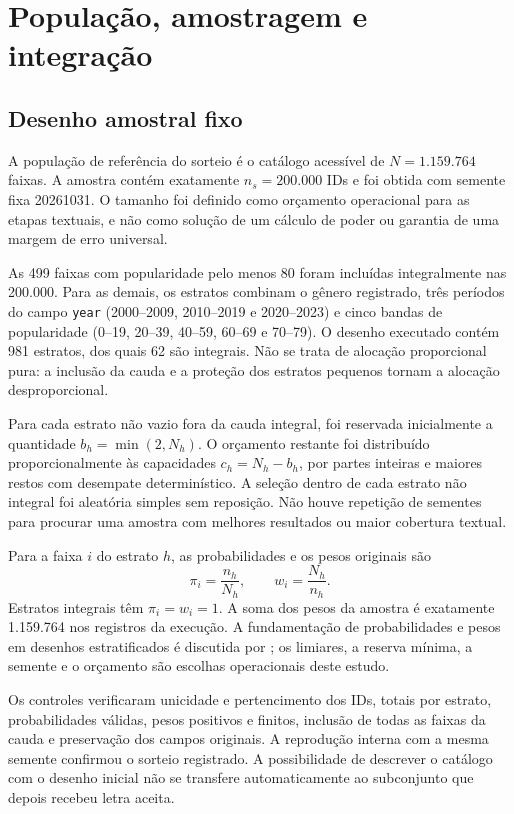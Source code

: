 \chapter{População, amostragem e integração}\label{cap:amostra}
\section{Desenho amostral fixo}
A população de referência do sorteio é o catálogo acessível de $N=1.159.764$ faixas. A amostra contém exatamente $n_s=200.000$ IDs e foi obtida com semente fixa 20261031. O tamanho foi definido como orçamento operacional para as etapas textuais, e não como solução de um cálculo de poder ou garantia de uma margem de erro universal.

As 499 faixas com popularidade pelo menos 80 foram incluídas integralmente nas 200.000. Para as demais, os estratos combinam o gênero registrado, três períodos do campo \texttt{year} (2000--2009, 2010--2019 e 2020--2023) e cinco bandas de popularidade (0--19, 20--39, 40--59, 60--69 e 70--79). O desenho executado contém 981 estratos, dos quais 62 são integrais. Não se trata de alocação proporcional pura: a inclusão da cauda e a proteção dos estratos pequenos tornam a alocação desproporcional.

Para cada estrato não vazio fora da cauda integral, foi reservada inicialmente a quantidade $b_h=\min(2,N_h)$. O orçamento restante foi distribuído proporcionalmente às capacidades $c_h=N_h-b_h$, por partes inteiras e maiores restos com desempate determinístico. A seleção dentro de cada estrato não integral foi aleatória simples sem reposição. Não houve repetição de sementes para procurar uma amostra com melhores resultados ou maior cobertura textual.

Para a faixa $i$ do estrato $h$, as probabilidades e os pesos originais são
\begin{equation}\label{eq:pesos}
 \pi_i=\frac{n_h}{N_h},\qquad w_i=\frac{N_h}{n_h}.
\end{equation}
Estratos integrais têm $\pi_i=w_i=1$. A soma dos pesos da amostra é exatamente 1.159.764 nos registros da execução. A fundamentação de probabilidades e pesos em desenhos estratificados é discutida por \citet{statcan2010}; os limiares, a reserva mínima, a semente e o orçamento são escolhas operacionais deste estudo.

Os controles verificaram unicidade e pertencimento dos IDs, totais por estrato, probabilidades válidas, pesos positivos e finitos, inclusão de todas as faixas da cauda e preservação dos campos originais. A reprodução interna com a mesma semente confirmou o sorteio registrado. A possibilidade de descrever o catálogo com o desenho inicial não se transfere automaticamente ao subconjunto que depois recebeu letra aceita.

